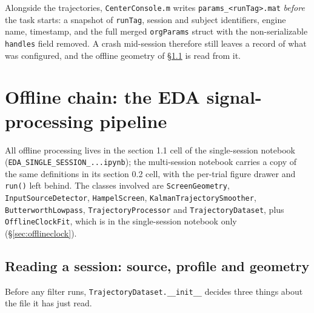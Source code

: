 \documentclass[11pt,a4paper]{article}
\newcommand{\code}[1]{\texttt{\small #1}}
\newcommand{\file}[1]{\texttt{\small #1}}
\begin{document}
Alongside the trajectories, \file{CenterConsole.m} writes
\code{params\_<runTag>.mat} \emph{before} the task starts: a snapshot of
\code{runTag}, session and subject identifiers, engine name, timestamp, and the
full merged \code{orgParams} struct with the non-serializable \code{handles}
field removed. A crash mid-session therefore still leaves a record of what was
configured, and the offline geometry of \S\ref{sec:reading} is read from it.

\section{Offline chain: the EDA signal-processing pipeline}
\label{sec:offline}

All offline processing lives in the section 1.1 cell of the single-session
notebook (\file{EDA\_SINGLE\_SESSION\_...ipynb}); the multi-session notebook
carries a copy of the same definitions in its section 0.2 cell, with the
per-trial figure drawer and \code{run()} left behind. The classes involved are
\code{ScreenGeometry}, \code{InputSourceDetector}, \code{HampelScreen},
\code{KalmanTrajectorySmoother}, \code{ButterworthLowpass},
\code{TrajectoryProcessor} and \code{TrajectoryDataset}, plus
\code{OfflineClockFit}, which is in the single-session notebook only
(\S\ref{sec:offlineclock}).

\subsection{Reading a session: source, profile and geometry}
\label{sec:reading}

Before any filter runs, \code{TrajectoryDataset.\_\_init\_\_} decides three
things about the file it has just read.
\end{document}
